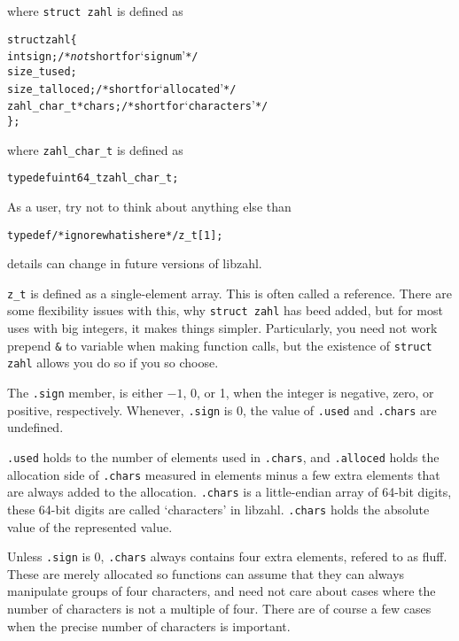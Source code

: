 \noindent
where {\tt struct zahl} is defined as

\begin{alltt}
   struct zahl \{
       int sign;            \textcolor{c}{/* \textrm{\emph{not} short for `signum'} */}
       size_t used;
       size_t alloced;      \textcolor{c}{/* \textrm{short for `allocated'} */}
       zahl_char_t *chars;  \textcolor{c}{/* \textrm{short for `characters'} */}
   \};
\end{alltt}

\noindent
where {\tt zahl\_char\_t} is defined as

\begin{alltt}
   typedef uint64_t zahl_char_t;
\end{alltt}

\noindent
As a user, try not to think about anything else than

\begin{alltt}
   typedef \textcolor{c}{/* \textrm{ignore what is here} */} z_t[1];
\end{alltt}

\noindent
details can change in future versions of libzahl.

{\tt z\_t} is defined as a single-element array.
This is often called a reference. There are some
flexibility issues with this, why {\tt struct zahl}
has beed added, but for most uses with big integers,
it makes things simpler. Particularly, you need not
work prepend {\tt \&} to variable when making function
calls, but the existence of {\tt struct zahl} allows
you do so if you so choose.

The {\tt .sign} member, is either $-1$, 0, or 1,
when the integer is negative, zero, or positive,
respectively. Whenever, {\tt .sign} is 0, the value
of {\tt .used} and {\tt .chars} are undefined.

{\tt .used} holds to the number of elements used in
{\tt .chars}, and {\tt .alloced} holds the allocation
side of {\tt .chars} measured in elements minus a few
extra elements that are always added to the allocation.
{\tt .chars} is a little-endian array of 64-bit digits,
these 64-bit digits are called `characters' in libzahl.
{\tt .chars} holds the absolute value of the
represented value.

Unless {\tt .sign} is 0, {\tt .chars} always contains
four extra elements, refered to as fluff. These are
merely allocated so functions can assume that they can
always manipulate groups of four characters, and need
not care about cases where the number of characters is
not a multiple of four. There are of course a few cases
when the precise number of characters is important.


